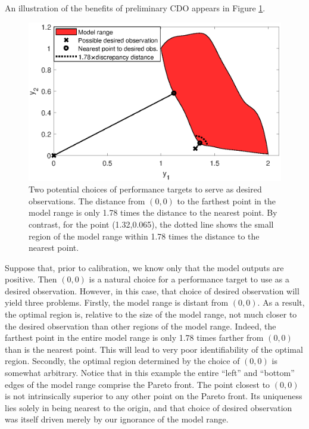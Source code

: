 \documentclass[12pt]{article}
\begin{document}
An illustration of the benefits of preliminary CDO appears in Figure \ref{fig:do_selection_example}.
%
\begin{figure}
\centering
\includegraphics[scale=.8]{FIG_des_obs_selection_example.eps}
\caption{Two potential choices of performance targets to serve as desired observations. 
%
The distance from $(0,0)$ to the farthest point in the model range is only 1.78 times the distance to the nearest point. 
%
By contrast, for the point (1.32,0.065), the dotted line shows the small region of the model range within 1.78 times the distance to the nearest point.}
\label{fig:do_selection_example}
\end{figure}
%
Suppose that, prior to calibration, we know only that the model outputs are positive.
%
Then $(0,0)$ is a natural choice for a performance target to use as a desired observation.
%
However, in this case, that choice of desired observation will yield three problems.
%
Firstly, the model range is distant from $(0,0)$.
%
As a result, the optimal region is, relative to the size of the model range, not much closer to the desired observation than other regions of the model range.
%
Indeed, the farthest point in the entire model range is only 1.78 times farther from $(0,0)$ than is the nearest point.
%
This will lead to very poor identifiability of the optimal region.
%
Secondly, the optimal region determined by the choice of $(0,0)$ is somewhat arbitrary.
%
Notice that in this example the entire ``left'' and ``bottom''  edges of the model range comprise the Pareto front.
%
The point closest to $(0,0)$ is not intrinsically superior to any other point on the Pareto front.
%
Its uniqueness lies solely in being nearest to the origin, and that choice of desired observation was itself driven merely by our ignorance of the model range.
\end{document}
